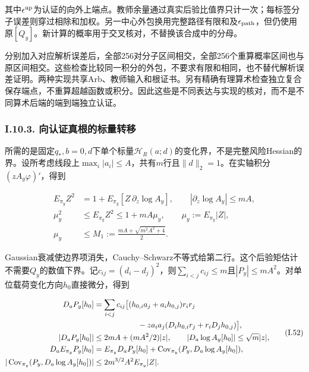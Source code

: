 \documentclass[11pt,a4paper]{article}
\begin{document}
其中\(\epsilon^{\rm up}\)为认证的向外上端点。教师余量通过真实后验比值界只计一次；每标签分子误差则穿过相除和加权。另一中心外包换用完整路径有限和及\(\epsilon_{\rm path}\)，但仍使用原\([Q_y]\)。新计算的概率用于交叉核对，不替换该合成中的分母。

分别加入对应解析误差后，全部256对分子区间相交，全部256个重算概率区间也与原区间相交。这些检查比较同一积分的外包，不要求有限和相同，也不替代解析误差证明。两种实现共享Arb、教师输入和根证书。另有精确有理算术检查独立复合保存端点，不重算超越函数或积分。因此这些是不同表达与实现的核对，而不是不同算术后端的端到端独立认证。

\subsubsection*{I.10.3.
向认证真根的标量转移}\label{i.10.3.-ux5411ux8ba4ux8bc1ux771fux6839ux7684ux6807ux91cfux8f6cux79fb}

所需的是固定\(q_*,b=0,d\)下单个标量\(\mathcal H_R(a;d)\)的变化界，不是完整风险Hessian的界。设所考虑线段上\(\max_i|a_i|\le A\)，共有\(m\)行且\(\|d\|_2=1\)。在实轴积分\((zA_y\varphi)'\)，得到

\[
\begin{aligned}
E_{\pi_y}Z^2&=1+E_{\pi_y}[Z\,\partial_z\log A_y],\qquad
|\partial_z\log A_y|\le mA,\\
\mu_y^2&\le E_{\pi_y}Z^2\le1+mA\mu_y,\qquad \mu_y:=E_{\pi_y}|Z|,\\
\mu_y&\le M_1:=\frac{mA+\sqrt{m^2A^2+4}}2.
\end{aligned}
\tag{I.51}
\]

Gaussian衰减使边界项消失，Cauchy--Schwarz不等式给第二行。这个后验矩估计不需要\(Q_y\)的数值下界。记\(c_{ij}=(d_i-d_j)^2\)，则\(\sum_{i<j}c_{ij}\le m\)且\(|P_y|\le mA^2\)。对单位载荷变化方向\(h_0\)直接微分，得到

\[
\begin{aligned}
D_aP_y[h_0]&=\sum_{i<j}c_{ij}\big[(h_{0,i}a_j+a_ih_{0,j})r_ir_j\\
&\hspace{20mm}-za_ia_j(D_ih_{0,i}r_j+r_iD_jh_{0,j})\big],\\
|D_aP_y[h_0]|&\le2mA+(mA^2/2)|z|,\qquad
|D_a\log A_y[h_0]|\le\sqrt m|z|,\\
D_a E_{\pi_y}P_y[h_0]&=E_{\pi_y}D_aP_y[h_0]
+\operatorname{Cov}_{\pi_y}(P_y,D_a\log A_y[h_0]),\\
|\operatorname{Cov}_{\pi_y}(P_y,D_a\log A_y[h_0])|
&\le2m^{3/2}A^2 E_{\pi_y}|Z|.
\end{aligned}
\tag{I.52}
\]
\end{document}
